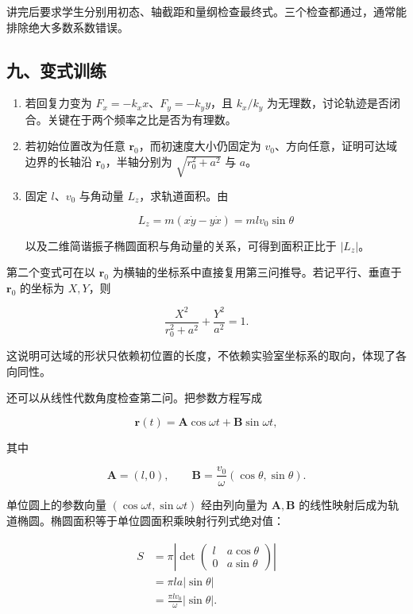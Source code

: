 \documentclass[12pt,a4paper,UTF8]{ctexart}
\begin{document}
讲完后要求学生分别用初态、轴截距和量纲检查最终式。三个检查都通过，通常能排除绝大多数系数错误。

\subsection{九、变式训练}\label{ux4e5dux53d8ux5f0fux8badux7ec3}

\begin{enumerate}
\def\labelenumi{\arabic{enumi}.}
\item
  若回复力变为 \(F_x=-k_xx\)、\(F_y=-k_yy\)，且 \(k_x/k_y\)
  为无理数，讨论轨迹是否闭合。关键在于两个频率之比是否为有理数。
\item
  若初始位置改为任意 \(\bm r_0\)，而初速度大小仍固定为
  \(v_0\)、方向任意，证明可达域边界的长轴沿 \(\bm r_0\)，半轴分别为
  \(\sqrt{r_0^2+a^2}\) 与 \(a\)。
\item
  固定 \(l\)、\(v_0\) 与角动量 \(L_z\)，求轨道面积。由

  \[L_z=m(x\dot y-y\dot x)=mlv_0\sin\theta\]

  以及二维简谐振子椭圆面积与角动量的关系，可得到面积正比于 \(|L_z|\)。
\end{enumerate}

第二个变式可在以 \(\bm r_0\)
为横轴的坐标系中直接复用第三问推导。若记平行、垂直于 \(\bm r_0\)
的坐标为 \(X,Y\)，则

\[\frac{X^2}{r_0^2+a^2}+\frac{Y^2}{a^2}=1.\]

这说明可达域的形状只依赖初位置的长度，不依赖实验室坐标系的取向，体现了各向同性。

还可以从线性代数角度检查第二问。把参数方程写成

\[\bm r(t)=\bm A\cos\omega t+\bm B\sin\omega t,\]

其中

\[\bm A=(l,0),\qquad
\bm B=\frac{v_0}{\omega}(\cos\theta,\sin\theta).\]

单位圆上的参数向量 \((\cos\omega t,\sin\omega t)\) 经由列向量为
\(\bm A,\bm B\)
的线性映射后成为轨道椭圆。椭圆面积等于单位圆面积乘映射行列式绝对值：

\[\begin{aligned}
S
&=\pi\left|\det\begin{pmatrix}
l&a\cos\theta\\
0&a\sin\theta
\end{pmatrix}\right|\\
&=\pi la|\sin\theta|\\
&=\frac{\pi l v_0}{\omega}|\sin\theta|.
\end{aligned}\]
\end{document}
